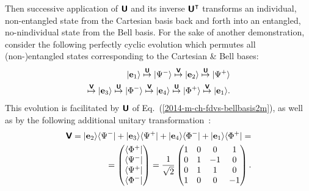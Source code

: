 \documentclass{ws-book9x6}
\begin{document}
Then successive application of  $\textsf{\textbf{U}}$ and its inverse $\textsf{\textbf{U}}^\intercal$ transforms an individual,
non-entangled state from the Cartesian basis back and forth
into an entangled, no-nindividual state from the Bell basis.
For the sake of another demonstration,
consider the following perfectly cyclic evolution  which permutes all (non-)entangled  states
corresponding to the Cartesian \&  Bell bases:
\begin{equation}
\begin{split}
\vert {\bf e}_1 \rangle
\stackrel{\textsf{\textbf{U}}}{\mapsto}
\vert \Psi^- \rangle
\stackrel{\textsf{\textbf{V}}}{\mapsto}
\vert {\bf e}_2 \rangle
\stackrel{\textsf{\textbf{U}}}{\mapsto}
\vert \Psi^+ \rangle   \\
\stackrel{\textsf{\textbf{V}}}{\mapsto}
\vert {\bf e}_3 \rangle
\stackrel{\textsf{\textbf{U}}}{\mapsto}
\vert \Phi^- \rangle
\stackrel{\textsf{\textbf{V}}}{\mapsto}
\vert {\bf e}_4 \rangle
\stackrel{\textsf{\textbf{U}}}{\mapsto}
\vert \Phi^+ \rangle
\stackrel{\textsf{\textbf{V}}}{\mapsto}
\vert {\bf e}_1 \rangle
.
\end{split}
\label{2017-m-pu-book-chapter-qm-baf}
\end{equation}
This evolution is facilitated by $\textsf{\textbf{U}}$
of Eq.~(\ref{2014-m-ch-fdvs-bellbasis2m}), as well as by the following additional unitary transformation~\cite{Schwinger.60}:
\begin{equation}
 \begin{split}
\textsf{\textbf{V}} =
\vert {\bf e}_2 \rangle \langle  \Psi^-  \vert  +
\vert {\bf e}_3 \rangle \langle  \Psi^+  \vert  +
\vert {\bf e}_4 \rangle \langle  \Phi^-  \vert  +
\vert {\bf e}_1 \rangle \langle  \Phi^+  \vert
=
\\
=
\begin{pmatrix}
 \langle \Phi^+ \vert \\
 \langle \Psi^- \vert \\
 \langle \Psi^+ \vert \\
 \langle \Phi^- \vert  \end{pmatrix}
=   \frac{1}{\sqrt{2}}
\begin{pmatrix}
1 & 0 &   0 &   1 \\
0 & 1 &   -1 &   0 \\
0& 1 &   1 &   0 \\
1 & 0 &  0 &  -1
 \end{pmatrix}
.
\end{split}
\label{2017-m-pu-book-chapter-qm-baf-uo}
\end{equation}
\end{document}
